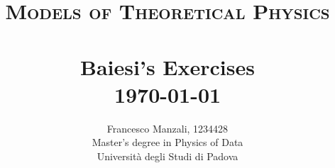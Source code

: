 \documentclass[../template.tex]{subfiles}
\begin{document}
\title{ \normalsize \textsc{Models of Theoretical Physics}
                \\ [2.0cm]
                \HRule{0.5pt} \\
                \LARGE \textbf{{Baiesi's Exercises}}
                \HRule{2pt} \\ [0.5cm]
                \normalsize \today \vspace*{5\baselineskip}}

\date{}

\author{
    Francesco Manzali, 1234428\\
    Master's degree in Physics of Data \\ 
    Università degli Studi di Padova}

\maketitle
\restoregeometry
\newpage
\end{document}
